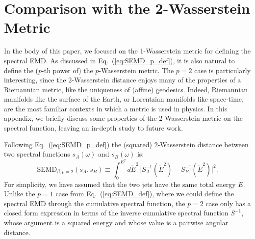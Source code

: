 \documentclass[letterpaper,11pt]{article}
\DeclareRobustCommand{\Eq}[1]{Eq.~(\ref{#1})}
\begin{document}
\section{Comparison with the 2-Wasserstein Metric}
\label{sec:riemannspec}


In the body of this paper, we focused on the 1-Wasserstein metric for defining the spectral EMD.
%
As discussed in \Eq{eq:SEMD_p_def}, it is also natural to define the ($p$-th power of) the $p$-Wasserstein metric.
%
The $p = 2$ case is particularly interesting, since the 2-Wasserstein distance enjoys many of the properties of a Riemannian metric, like the uniqueness of (affine) geodesics.
%
Indeed, Riemannian manifolds like the surface of the Earth, or Lorentzian manifolds like space-time, are the most familiar contexts in which a metric is used in physics.
%
In this appendix, we briefly discuss some properties of the 2-Wasserstein metric on the spectral function, leaving an in-depth study to future work.



Following \Eq{eq:SEMD_p_def} the (squared) 2-Wasserstein distance between two spectral functions $s_A(\omega)$ and $s_B(\omega)$ is:
%
\begin{equation}
\label{eq:SEMD_2_def}
\text{SEMD}_{\beta,p=2}(s_A, s_B) \equiv \int_{0}^{E^2} d\tilde{E}^2\, \big| S^{-1}_A(\tilde{E}^2) - S^{-1}_B(\tilde{E}^2) \big|^2 .
\end{equation}
%
For simplicity, we have assumed that the two jets have the same total energy $E$.
%
Unlike the $p = 1$ case from \Eq{eq:SEMD_def}, where we could define the spectral EMD through the cumulative spectral function, the $p = 2$ case only has a closed form expression in terms of the inverse cumulative spectral function $S^{-1}$, whose argument is a squared energy and whose value is a pairwise angular distance.
%
\end{document}
